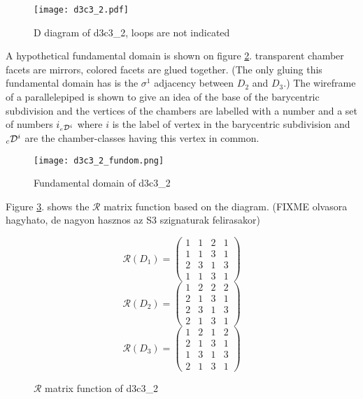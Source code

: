 \documentclass[12pt,a4paper]{article}
\newcommand{\leftsub}[2]{{\vphantom{#2}}_{#1}{#2}}
\theoremstyle{plain}%
\theoremstyle{definition}
\theoremstyle{remark}
\begin{document}
\begin{figure}
  \caption{\label{fig:d3c3_2} D diagram of d3c3\_2, loops are not indicated}
  \center
  \texttt{[image: d3c3\_2.pdf]}
\end{figure}

A hypothetical fundamental domain is shown on figure \ref{fig:d3c3_2_fundom}.
transparent chamber facets are mirrors, colored facets are glued together. (The
only gluing this fundamental domain has is the $\sigma^1$ adjacency between
$D_2$ and $D_3$.) The wireframe of a parallelepiped is shown to give an idea of
the base of the barycentric subdivision and the vertices of the chambers are
labelled with a number and a set of numbers $i_{\leftsub{c}{\mathcal{D}}^i}$
where $i$ is the label of vertex in the barycentric subdivision and
$\leftsub{c}{\mathcal{D}}^i$ are the chamber-classes having this vertex in
common.

\begin{figure}
  \caption{\label{fig:d3c3_2_fundom} Fundamental domain of d3c3\_2}
  \center
  \texttt{[image: d3c3\_2\_fundom.png]}
\end{figure}

Figure \ref{fig:d3c3_2_r}. shows the $\mathcal{R}$ matrix function based on the
diagram. (FIXME olvasora hagyhato, de nagyon hasznos az S3 szignaturak
felirasakor)

\begin{figure}
  \caption{\label{fig:d3c3_2_r} $\mathcal{R}$ matrix function of d3c3\_2}
  \begin{equation*}
    \mathcal{R}(D_1)=
    \left(
    \begin{array}{cccc}
      1 & 1 & 2 & 1\\
      1 & 1 & 3 & 1\\
      2 & 3 & 1 & 3\\
      1 & 1 & 3 & 1
    \end{array}
    \right)
  \end{equation*}
  \begin{equation*}
    \mathcal{R}(D_2)=
    \left(
    \begin{array}{cccc}
      1 & 2 & 2 & 2\\
      2 & 1 & 3 & 1\\
      2 & 3 & 1 & 3\\
      2 & 1 & 3 & 1
    \end{array}
    \right)
  \end{equation*}
  \begin{equation*}
    \mathcal{R}(D_3)=
    \left(
    \begin{array}{cccc}
      1 & 2 & 1 & 2\\
      2 & 1 & 3 & 1\\
      1 & 3 & 1 & 3\\
      2 & 1 & 3 & 1
    \end{array}
    \right)
  \end{equation*}
\end{figure}
\end{document}
